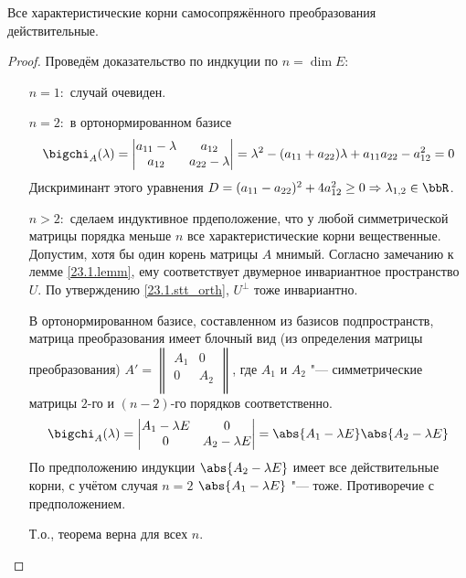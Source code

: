   \begin{thm}\label{23.1.thm1}
  Все характеристические корни самосопряжённого преобразования действительные.
  \end{thm}
  \begin{proof} Проведём доказательство по индкуции по $n=\dim E$:
  \linebreak\vspace*{-\baselineskip}
  \begin{itemize}
  \item[\underline{$n=1:$}] случай очевиден.
  \item[\underline{$n=2:$}] в ортонормированном базисе
    \begin{equation}
    \bigchi_A(\lambda)=\begin{vmatrix}
    a_{11}-\lambda & a_{12} \\
    a_{12} & a_{22}-\lambda
    \end{vmatrix}=\lambda^2-(a_{11}+a_{22})\lambda+a_{11}a_{22}-a_{12}^2=0 \end{equation}
    Дискриминант этого уравнения $D=(a_{11}-a_{22})^2+4a_{12}^2 \ge 0 \Rightarrow \lambda_{1,2} \in \bbR$.
  \item[\underline{$n>2:$}] сделаем индуктивное прдеположение, что у любой симметрической матрицы порядка меньше $n$ все характеристические корни вещественные. Допустим, хотя бы один корень матрицы $A$ мнимый. Согласно замечанию к лемме \ref{23.1.lemm}, ему соответствует двумерное инвариантное пространство $U$. По утверждению \ref{23.1.stt_orth}, $U^\perp$ тоже инвариантно.
  
  В ортонормированном базисе, составленном из базисов подпространств, матрица преобразования имеет блочный вид (из определения матрицы преобразования) $A'=\begin{Vmatrix}
  A_1 & 0 \\
  0 & A_2 \\
  \end{Vmatrix}$, где $A_1$ и $A_2$ "--- симметрические матрицы $2$-го и $(n-2)$-го порядков соответственно.
    \begin{equation}
    \bigchi_A(\lambda)=\begin{vmatrix}
    A_1-\lambda E & 0 \\
    0 & A_2-\lambda E
    \end{vmatrix}=\abs{A_1-\lambda E}\abs{A_2-\lambda E} \end{equation}
    По предположению индукции  $\abs{A_2-\lambda E}$ имеет все действительные корни, с учётом случая \underline{$n=2$} $\abs{A_1-\lambda E}$ "--- тоже. Противоречие с предположением. 
    
    Т.о., теорема верна для всех $n$.
  \end{itemize}
  \vspace{-1.65\baselineskip}  
  \end{proof}
  

